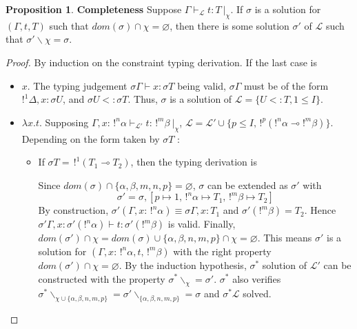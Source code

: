 \documentclass[10pt]{article}
\theoremstyle{plain}
\theoremstyle{definition}
\newtheorem{prop}{Proposition}[section]
\begin{document}
\begin{prop}{\bf Completeness}
	Suppose $\Gamma \vdash_\mathcal{L} t : T ~|_\chi$. If $\sigma$ is a solution for $(\Gamma, t, T)$ such that
	$dom(\sigma) \cap \chi = \varnothing$, then there 	is some solution $\sigma'$ of $\mathcal{L}$ such that
	$\sigma' \backslash \chi = \sigma$.
	
	\begin{proof}
		By induction on the constraint typing derivation. If the last case is
		\begin{itemize}
		\item $x$. The typing judgement $\sigma \Gamma \vdash x : \sigma T$ being valid, $\sigma \Gamma$ must be of the form
			$!^1 \Delta, x : \sigma U$, and $\sigma U <: \sigma T$. Thus, $\sigma$ is a solution of $\mathcal{L} = \{ U <: T, 1 \le I \}$.
			
		\item $\lambda x.t$. Supposing $\Gamma, x : \,!^n\alpha \vdash_\mathcal{L'} t : \,!^m\beta ~|_\chi$, $\mathcal{L} = \mathcal{L'} \cup
			\{ p \le I, \,!^p(!^n\alpha \multimap !^m\beta) \}$.
			Depending on the form taken by $\sigma T$ :
			\begin{itemize}
			\item If $\sigma T = \,!^1 (T_1 \multimap T_2)$, then the typing derivation is
				\begin{prooftree}
				\end{prooftree}
				Since $dom(\sigma) \cap \{\alpha, \beta, m, n, p\} = \varnothing$, $\sigma$ can be extended as $\sigma'$ with
					$$\sigma' = \sigma, [p \mapsto 1, \,!^n\alpha \mapsto T_1, \,!^m\beta \mapsto T_2]$$
				By construction, $\sigma' (\Gamma, x : \,!^n\alpha) \equiv \sigma\Gamma, x : T_1$ and $\sigma' (!^m \beta) = T_2$. Hence
				$\sigma' \Gamma, x : \sigma'(!^n\alpha) \vdash t : \sigma'(!^m \beta)$ is valid. Finally,
				$dom(\sigma') \cap \chi = dom(\sigma) \cup \{\alpha, \beta, n, m, p\} \cap \chi = \varnothing$.
				This means $\sigma'$ is a solution for $(\Gamma,x : \,!^n\alpha, t, \,!^m\beta)$ with the right property
				$dom(\sigma') \cap \chi = \varnothing$. By the induction hypothesis, $\sigma^*$ solution of $\mathcal{L'}$ can be constructed
				with the property $\sigma^* \backslash_\chi = \sigma'$.
				$\sigma^*$ also verifies $\sigma^*\backslash_{\chi \cup \{\alpha, \beta, n, m , p\}} =
				\sigma' \backslash_{\{\alpha, \beta, n, m, p \}} = \sigma$ and $\sigma^* \mathcal{L}$ solved. \\
					

\end{itemize}
\end{itemize}
\end{proof}
\end{prop}
\end{document}

